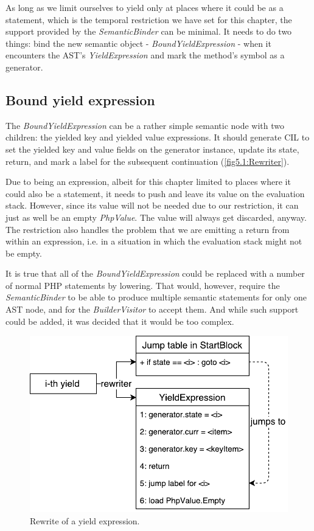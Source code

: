 As long as we limit ourselves to yield only at places where it could be as a statement, which is the temporal restriction we have set for this chapter, the support provided by the \emph{SemanticBinder} can be minimal. It needs to do two things: bind the new semantic object - \emph{BoundYieldExpression} - when it encounters the AST’s \emph{YieldExpression} and mark the method’s symbol as a generator. 

\subsection{Bound yield expression}

The \emph{BoundYieldExpression} can be a rather simple semantic node with two children: the yielded key and yielded value expressions. It should generate CIL to set the yielded key and value fields on the generator instance, update its state, return, and mark a label for the subsequent continuation (\autoref{fig5.1:Rewriter}). 

Due to being an expression, albeit for this chapter limited to places where it could also be a statement, it needs to push and leave its value on the evaluation stack. However, since its value will not be needed due to our restriction, it can just as well be an empty \emph{PhpValue}. The value will always get discarded, anyway. The restriction also handles the problem that we are emitting a return from within an expression, i.e. in a situation in which the evaluation stack might not be empty.

It is true that all of the \emph{BoundYieldExpression} could be replaced with a number of normal PHP statements by lowering. That would, however, require the \emph{SemanticBinder} to be able to produce multiple semantic statements for only one AST node, and for the \emph{BuilderVisitor} to accept them. And while such support could be added, it was decided that it would be too complex.

\begin{figure}[h]
	\centering	
	\includegraphics[scale=0.75]{../img/5_1_rewriter}	
	\caption{Rewrite of a yield expression.}
	\label{fig5.1:Rewriter}
\end{figure}



